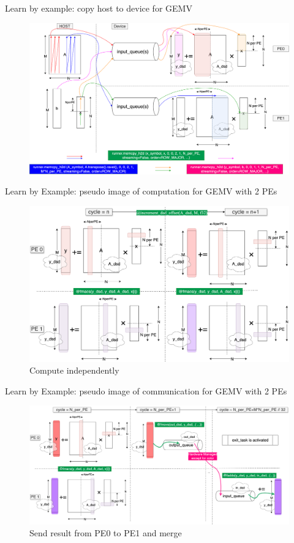 \documentclass[dvipdfmx, 11pt, aspectratio=169]{beamer}   %
\begin{document}
\begin{frame}{Learn by example: copy host to device for GEMV}
\vspace{-0.5\baselineskip}
\begin{figure}
    \includegraphics[scale=0.07]{img/csCopyh2d.png}
\end{figure}
\end{frame}
\begin{frame}{Learn by Example: pseudo image of computation for GEMV with 2 PEs}
\begin{figure}
    \includegraphics[scale=0.065]{img/csGEMV1.png}
    \caption{Compute independently}
\end{figure}
\end{frame}
\begin{frame}{Learn by Example: pseudo image of communication for GEMV with 2 PEs}
\vspace{-\baselineskip}
\begin{figure}
    \includegraphics[scale=0.063]{img/csGEMVsendrecv.png}
    \caption{Send result from PE0 to PE1 and merge}
\end{figure}
\end{frame}
\end{document}
